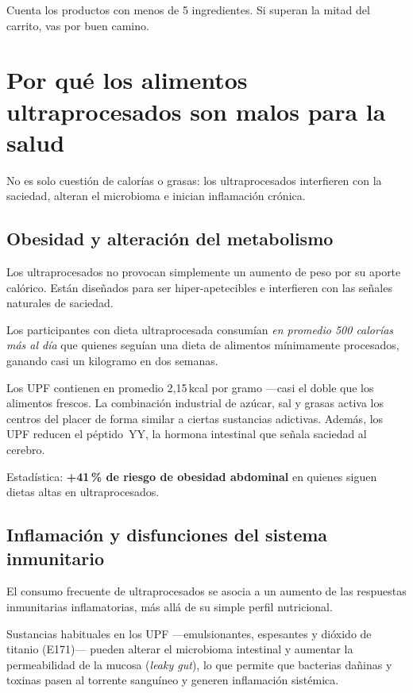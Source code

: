 \documentclass[a5paper,12pt,oneside,openany]{book}
\newcommand{\boxverde}[2]{%
  \begin{tcolorbox}[cajabase,
    colback=verdescuro!8!white, colframe=verdescuro, title={#1}]
  #2\end{tcolorbox}}
\newcommand{\boxinfo}[2]{%
  \begin{tcolorbox}[cajabase,
    colback=azulinfo!8!white, colframe=azulinfo, title={#1}]
  #2\end{tcolorbox}}
\begin{document}
\boxverde{La prueba del carrito}{Cuenta los productos con menos de 5 ingredientes.
Si superan la mitad del carrito, vas por buen camino.}

\chapter{Por qué los alimentos ultraprocesados son malos para la salud}

No es solo cuestión de calorías o grasas: los ultraprocesados interfieren con
la saciedad, alteran el microbioma e inician inflamación crónica.

\section{Obesidad y alteración del metabolismo}

Los ultraprocesados no provocan simplemente un aumento de peso por su aporte
calórico. Están diseñados para ser hiper-apetecibles e interfieren con las
señales naturales de saciedad.

\boxinfo{Estudio Kevin Hall (NIH, 2019)}{Los participantes con dieta
ultraprocesada consumían \emph{en promedio 500 calorías más al día} que
quienes seguían una dieta de alimentos mínimamente procesados, ganando
casi un kilogramo en dos semanas.}

Los UPF contienen en promedio 2,15\,kcal por gramo ---casi el doble que los
alimentos frescos. La combinación industrial de azúcar, sal y grasas activa
los centros del placer de forma similar a ciertas sustancias adictivas.
Además, los UPF reducen el péptido~YY, la hormona intestinal que señala
saciedad al cerebro.

Estadística: \textbf{+41\,\% de riesgo de obesidad abdominal} en quienes siguen
dietas altas en ultraprocesados.

\section{Inflamación y disfunciones del sistema inmunitario}

El consumo frecuente de ultraprocesados se asocia a un aumento de las respuestas
inmunitarias inflamatorias, más allá de su simple perfil nutricional.

Sustancias habituales en los UPF ---emulsionantes, espesantes y dióxido de
titanio (E171)--- pueden alterar el microbioma intestinal y aumentar la
permeabilidad de la mucosa (\textit{leaky gut}), lo que permite que bacterias
dañinas y toxinas pasen al torrente sanguíneo y generen inflamación sistémica.
\end{document}
